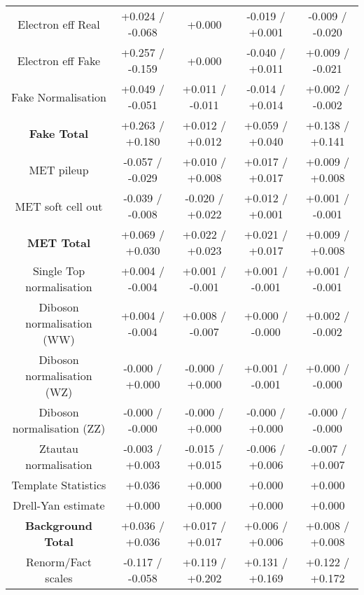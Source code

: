 \begin{table}[htbp]
\begin{center}
\begin{tabular}{|c|c|c|c|c|}
Electron eff Real                     &+0.024   / -0.068   & +0.000              & -0.019   / +0.001   & -0.009   / -0.020  \\
Electron eff Fake                     &+0.257   / -0.159   & +0.000              & -0.040   / +0.011   & +0.009   / -0.021  \\
Fake Normalisation                    &+0.049   / -0.051   & +0.011   / -0.011   & -0.014   / +0.014   & +0.002   / -0.002  \\
\hline
\textbf{Fake Total}                   &+0.263   / +0.180   & +0.012   / +0.012   & +0.059   / +0.040   & +0.138   / +0.141  \\
\hline
MET pileup                            &-0.057   / -0.029   & +0.010   / +0.008   & +0.017   / +0.017   & +0.009   / +0.008  \\
MET soft cell out                     &-0.039   / -0.008   & -0.020   / +0.022   & +0.012   / +0.001   & +0.001   / -0.001  \\
\hline
\textbf{MET Total}                    &+0.069   / +0.030   & +0.022   / +0.023   & +0.021   / +0.017   & +0.009   / +0.008  \\
\hline
Single Top normalisation              &+0.004   / -0.004   & +0.001   / -0.001   & +0.001   / -0.001   & +0.001   / -0.001  \\
Diboson normalisation (WW)            &+0.004   / -0.004   & +0.008   / -0.007   & +0.000   / -0.000   & +0.002   / -0.002  \\
Diboson normalisation (WZ)            &-0.000   / +0.000   & -0.000   / +0.000   & +0.001   / -0.001   & +0.000   / -0.000  \\
Diboson normalisation (ZZ)            &-0.000   / -0.000   & -0.000   / +0.000   & -0.000   / +0.000   & -0.000   / -0.000  \\
Ztautau normalisation                 &-0.003   / +0.003   & -0.015   / +0.015   & -0.006   / +0.006   & -0.007   / +0.007  \\
Template Statistics                   &+0.036              & +0.000              & +0.000              & +0.000             \\
Drell-Yan estimate                    &+0.000              & +0.000              & +0.000              & +0.000             \\
\hline
\textbf{Background Total}             &+0.036   / +0.036   & +0.017   / +0.017   & +0.006   / +0.006   & +0.008   / +0.008  \\
\hline
Renorm/Fact scales                    &-0.117   / -0.058   & +0.119   / +0.202   & +0.131   / +0.169   & +0.122   / +0.172  \\

\end{tabular}
\end{center}
\end{table}
